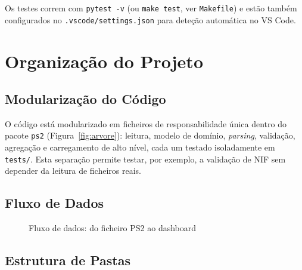 \documentclass[11pt,a4paper]{report}
\begin{document}
Os testes correm com \texttt{pytest -v} (ou \texttt{make test}, ver
\texttt{Makefile}) e estão também configurados no \texttt{.vscode/settings.json}
para deteção automática no VS Code.

\chapter{Organização do Projeto}
\label{chap:organizacao}

\section{Modularização do Código}

O código está modularizado em ficheiros de responsabilidade única dentro do
pacote \texttt{ps2} (Figura~\ref{fig:arvore}): leitura, modelo de domínio,
\textit{parsing}, validação, agregação e carregamento de alto nível, cada um
testado isoladamente em \texttt{tests/}. Esta separação permite testar, por
exemplo, a validação de NIF sem depender da leitura de ficheiros reais.

\section{Fluxo de Dados}

\begin{figure}[H]\centering
{}
\caption{Fluxo de dados: do ficheiro PS2 ao dashboard}\label{fig:fluxo}
\end{figure}

\section{Estrutura de Pastas}
\end{document}
